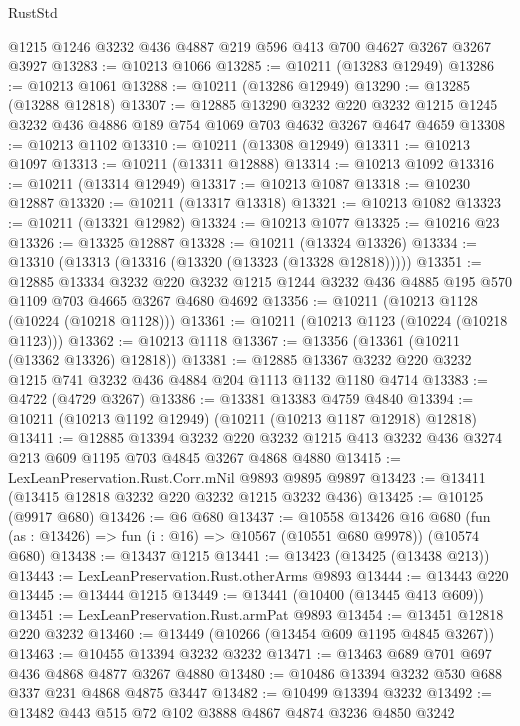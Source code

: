 \begin{lexlean}{RustStd}
\begin{coremodule}
    @1215
    @1246
    @3232
    @436
    @4887
    @219
    @596
    @413
    @700
    @4627
    @3267
    @3267
    @3927
@13283 := @10213 @1066
@13285 := @10211 (@13283 @12949)
@13286 := @10213 @1061
@13288 := @10211 (@13286 @12949)
@13290 := @13285 (@13288 @12818)
@13307 := @12885
    @13290
    @3232
    @220
    @3232
    @1215
    @1245
    @3232
    @436
    @4886
    @189
    @754
    @1069
    @703
    @4632
    @3267
    @4647
    @4659
@13308 := @10213 @1102
@13310 := @10211 (@13308 @12949)
@13311 := @10213 @1097
@13313 := @10211 (@13311 @12888)
@13314 := @10213 @1092
@13316 := @10211 (@13314 @12949)
@13317 := @10213 @1087
@13318 := @10230 @12887
@13320 := @10211 (@13317 @13318)
@13321 := @10213 @1082
@13323 := @10211 (@13321 @12982)
@13324 := @10213 @1077
@13325 := @10216 @23
@13326 := @13325 @12887
@13328 := @10211 (@13324 @13326)
@13334 := @13310 (@13313 (@13316 (@13320 (@13323 (@13328 @12818)))))
@13351 := @12885
    @13334
    @3232
    @220
    @3232
    @1215
    @1244
    @3232
    @436
    @4885
    @195
    @570
    @1109
    @703
    @4665
    @3267
    @4680
    @4692
@13356 := @10211 (@10213 @1128 (@10224 (@10218 @1128)))
@13361 := @10211 (@10213 @1123 (@10224 (@10218 @1123)))
@13362 := @10213 @1118
@13367 := @13356 (@13361 (@10211 (@13362 @13326) @12818))
@13381 := @12885 @13367 @3232 @220 @3232 @1215 @741 @3232 @436 @4884 @204 @1113 @1132 @1180 @4714
@13383 := @4722 (@4729 @3267)
@13386 := @13381 @13383 @4759 @4840
@13394 := @10211 (@10213 @1192 @12949) (@10211 (@10213 @1187 @12918) @12818)
@13411 := @12885
    @13394
    @3232
    @220
    @3232
    @1215
    @413
    @3232
    @436
    @3274
    @213
    @609
    @1195
    @703
    @4845
    @3267
    @4868
    @4880
@13415 := LexLeanPreservation.Rust.Corr.mNil @9893 @9895 @9897
@13423 := @13411 (@13415 @12818 @3232 @220 @3232 @1215 @3232 @436)
@13425 := @10125 (@9917 @680)
@13426 := @6 @680
@13437 := @10558
    @13426
    @16
    @680
    (fun (as : @13426) => fun (i : @16) => @10567 (@10551 @680 @9978))
    (@10574 @680)
@13438 := @13437 @1215
@13441 := @13423 (@13425 (@13438 @213))
@13443 := LexLeanPreservation.Rust.otherArms @9893
@13444 := @13443 @220
@13445 := @13444 @1215
@13449 := @13441 (@10400 (@13445 @413 @609))
@13451 := LexLeanPreservation.Rust.armPat @9893
@13454 := @13451 @12818 @220 @3232
@13460 := @13449 (@10266 (@13454 @609 @1195 @4845 @3267))
@13463 := @10455 @13394 @3232 @3232
@13471 := @13463 @689 @701 @697 @436 @4868 @4877 @3267 @4880
@13480 := @10486 @13394 @3232 @530 @688 @337 @231 @4868 @4875 @3447
@13482 := @10499 @13394 @3232
@13492 := @13482 @443 @515 @72 @102 @3888 @4867 @4874 @3236 @4850 @3242

\end{coremodule}
\end{lexlean}
